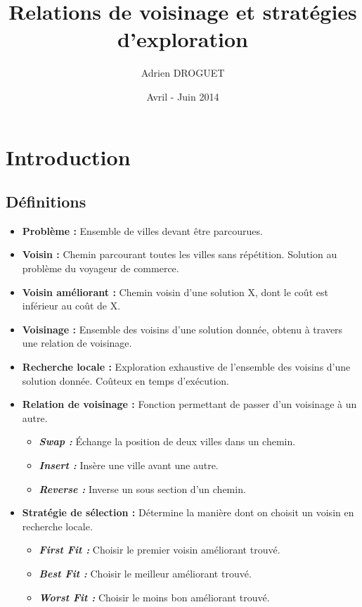 \documentclass[a4paper,10pt]{report}
\title{Relations de voisinage et stratégies d'exploration}
\author{Adrien DROGUET}
\date{Avril - Juin 2014}
\begin{document}
\maketitle

\tableofcontents
\pagebreak

\chapter*{Introduction}
\section*{Définitions}
\begin{itemize}
 \item \textbf{Problème :} Ensemble de villes devant être parcourues.
 \item \textbf{Voisin :} Chemin parcourant toutes les villes sans répétition.
Solution au problème du voyageur de commerce.
 \item \textbf{Voisin améliorant :} Chemin voisin d'une solution X, dont le coût
est inférieur au coût de X.
 \item \textbf{Voisinage :} Ensemble des voisins d'une solution donnée, obtenu à
travers une relation de voisinage.
 \item \textbf{Recherche locale :} Exploration exhaustive de l'ensemble des
voisins d'une solution donnée. Coûteux en temps d'exécution.
 \item \textbf{Relation de voisinage :} Fonction permettant de passer d'un
voisinage à un autre.
 \begin{itemize}
  \item \textit{\textbf{Swap :}} Échange la position de deux villes dans un
chemin.
  \item \textit{\textbf{Insert :}} Insère une ville avant une autre.
  \item \textit{\textbf{Reverse :}} Inverse un sous section d'un chemin.
 \end{itemize}
 \item \textbf{Stratégie de sélection :} Détermine la manière dont on choisit un
voisin en recherche locale.
 \begin{itemize}
  \item \textit{\textbf{First Fit :}} Choisir le premier voisin améliorant
trouvé.
  \item \textit{\textbf{Best Fit :}} Choisir le meilleur améliorant trouvé.
  \item \textit{\textbf{Worst Fit :}} Choisir le moins bon améliorant trouvé.
 \end{itemize}
\end{itemize}
\end{document}
